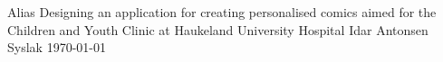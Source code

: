 \documentclass[a4paper, 11pt]{report}
\begin{document}
    \maketitlepage
        {Alias}
        {Designing an application for creating personalised comics aimed for the Children and Youth Clinic at Haukeland University Hospital}
        {Idar Antonsen Syslak}
        {\printdayoff \today}
    
    
    
    
    
    \tableofcontents
    \listoffigures
    \listoftables
    
    
    
    
    
    
    
    
    
    
    
    \printbibliography
    
\end{document}
